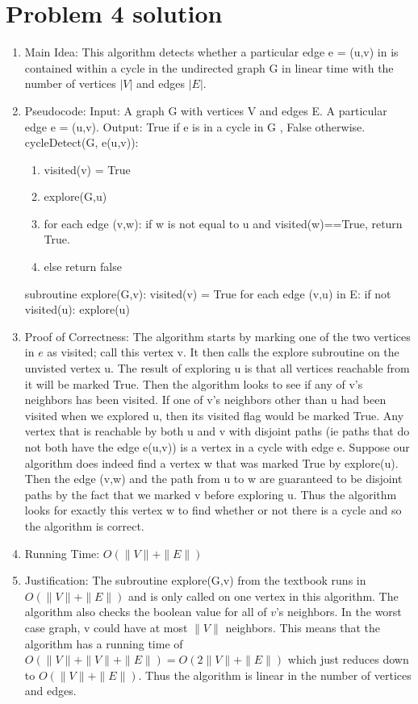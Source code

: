 \documentclass[11pt]{article}
\begin{document}
\section*{Problem 4 solution}
\begin{enumerate}
\item Main Idea: This algorithm detects whether a particular edge e = (u,v) in is contained within a cycle in the undirected graph G in linear time with the number of vertices $|V|$ and edges $|E|$.
\item Pseudocode: \newline
Input: A graph G with vertices V and edges E. A particular edge e = (u,v).\newline
Output: True if e is in a cycle in G , False otherwise.\newline
cycleDetect(G, e(u,v)):
\begin{enumerate}
\item visited(v) = True
\item explore(G,u)
\item for each edge (v,w): if w is not equal to u and visited(w)==True, return True.
\item else return false
\end{enumerate}
subroutine explore(G,v):\newline
\indent visited(v) = True\newline
\indent for each edge (v,u) in E:
\indent\indent if not visited(u): explore(u)
\item Proof of Correctness: The algorithm starts by marking one of the two vertices in $e$ as visited; call this vertex v. It then calls the explore subroutine on the unvisted vertex u. The result of exploring u is that all vertices reachable from it will be marked True. Then the algorithm looks to see if any of v's neighbors has been visited. If one of v's neighbors other than u had been visited when we explored u, then its visited flag would be marked True. Any vertex that is reachable by both u and v with disjoint paths (ie paths that do not both have the edge e(u,v)) is a vertex in a cycle with edge e. Suppose our algorithm does indeed find a vertex w that was marked True by explore(u). Then the edge (v,w) and the path from u to w are guaranteed to be disjoint paths by the fact that we marked v before exploring u. Thus the algorithm looks for exactly this vertex w to find whether or not there is a cycle and so the algorithm is correct.
\item Running Time: $O(\|V\|+\|E\|)$
\item Justification: The subroutine explore(G,v) from the textbook runs in $O(\|V\|+\|E\|)$ and is only called on one vertex in this algorithm. The algorithm also checks the boolean value for all of $v$'s neighbors. In the worst case graph, v could have at most $\|V\|$ neighbors. This means that the algorithm has a running time of $O(\|V\|+\|V\|+\|E\|)=O(2\|V\|+\|E\|)$ which just reduces down to $O(\|V\|+\|E\|)$. Thus the algorithm is linear in the number of vertices and edges.
\end{enumerate}
\end{document}

